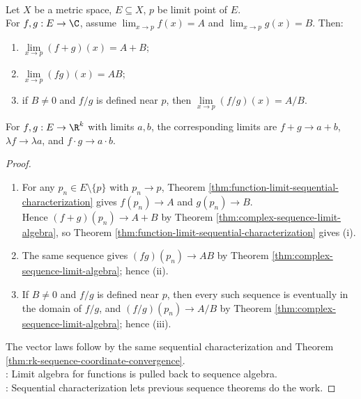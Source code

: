 \begin{theorem} \label{thm:function-limit-algebra} \\
Let $X$ be a metric space, $E\subseteq X$, $p$ be limit point of $E$.\\
For $f,g:E\to\C$, assume $\lim_{x\to p}f(x)=A$ and $\lim_{x\to p}g(x)=B$. Then:
\begin{enumerate}[label=(\roman*)]
\setlength{\itemsep}{0pt}
\item $\lim\limits_{x\to p}(f+g)(x)=A+B$;
\item $\lim\limits_{x\to p}(fg)(x)=AB$;
\item if $B\neq0$ and $f/g$ is defined near $p$, then $\lim\limits_{x\to p}(f/g)(x)=A/B$.
\end{enumerate}
For $f,g:E\to\R^k$ with limits $a,b$, the corresponding limits are $f+g\to a+b$, $\lambda f\to\lambda a$, and $f\cdot g\to a\cdot b$.
\begin{proof}
\begin{enumerate}[label=(\roman*)]
\setlength{\itemsep}{0pt}
\item For any $p_n\in E\setminus\{p\}$ with $p_n\to p$, Theorem \ref{thm:function-limit-sequential-characterization} gives $f(p_n)\to A$ and $g(p_n)\to B$.\\
Hence $(f+g)(p_n)\to A+B$ by Theorem \ref{thm:complex-sequence-limit-algebra}, so Theorem \ref{thm:function-limit-sequential-characterization} gives (i).
\item The same sequence gives $(fg)(p_n)\to AB$ by Theorem \ref{thm:complex-sequence-limit-algebra}; hence (ii).
\item If $B\neq0$ and $f/g$ is defined near $p$, then every such sequence is eventually in the domain of $f/g$, and $(f/g)(p_n)\to A/B$ by Theorem \ref{thm:complex-sequence-limit-algebra}; hence (iii).
\end{enumerate}
The vector laws follow by the same sequential characterization and Theorem \ref{thm:rk-sequence-coordinate-convergence}.\\
: Limit algebra for functions is pulled back to sequence algebra.\\
: Sequential characterization lets previous sequence theorems do the work.
\end{proof}
\end{theorem}

